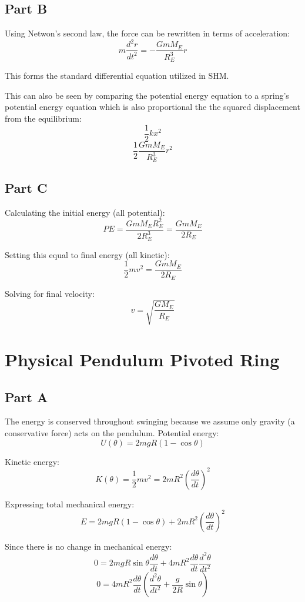 \documentclass{article}
\begin{document}
\subsection*{ Part B }

Using Netwon's second law, the force can be rewritten in terms of acceleration:
$$ m \frac{ d^{2}r }{ dt^{2} } = - \frac{ G m M_{E} }{ R_{E}^{3} } r $$

This forms the standard differential equation utilized in SHM.

\bigbreak

This can also be seen by comparing the potential energy equation to a spring's
potential energy equation which is also proportional the the squared
displacement from the equilibrium:
$$ \frac{ 1 }{ 2 } k x^{2} $$
$$ \frac{ 1 }{ 2 } \frac{ G m M_{E} }{ R_{E}^{3} } r^{2} $$ 

\subsection*{ Part C }

Calculating the initial energy (all potential):
$$ PE = \frac{ G m M_{E} R_{E}^{2} }{ 2 R_{E}^{3} } = \frac{ G m M_{E} }{ 2 R_{E} } $$

Setting this equal to final energy (all kinetic):
$$ \frac{ 1 }{ 2 } m v^{2} = \frac{ G m M_{E} }{ 2 R_{E} } $$

Solving for final velocity:
$$ v = \sqrt{ \frac{ G M_{E} }{ R_{E} } } $$

\section{ Physical Pendulum Pivoted Ring }

\subsection*{ Part A }

The energy is conserved throughout swinging because we assume only gravity (a
conservative force) acts on the pendulum. Potential energy:
$$ U( \theta ) = 2 m g R ( 1 - \cos \theta ) $$

Kinetic energy:
$$ K( \theta ) = \frac{ 1 }{ 2 } m v^{2} = 2 m R^{2} \left( \frac{ d\theta }{ dt }
\right)^{2} $$

Expressing total mechanical energy:
$$ E =  2 m g R ( 1 - \cos \theta ) + 2 m R^{2} \left( \frac{ d\theta }{ dt }
\right)^{2} $$

Since there is no change in mechanical energy:
$$ 0 = 2 m g R \sin \theta \frac{ d\theta }{ dt } + 4 m R^{2} \frac{ d\theta }{
dt} \frac{ d^{2}\theta }{ dt^{2} } $$
$$ 0 = 4 m R^{2} \frac{ d\theta }{ dt } \left( \frac{ d^{2}\theta }{ dt^{2} } +
\frac{ g }{ 2 R } \sin \theta \right) $$
\end{document}

